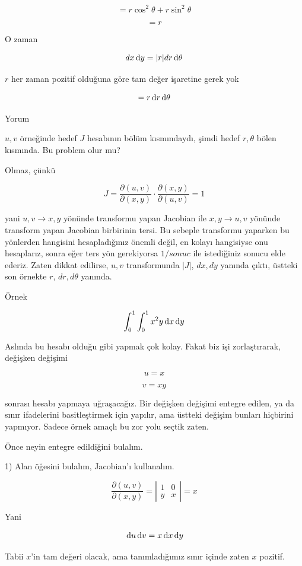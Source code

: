 \documentclass[12pt,fleqn]{article}\usepackage{../../common}
\begin{document}
$$ = r\cos^2\theta + r\sin^2\theta $$

$$ = r $$

O zaman 

$$ dx \,\mathrm{d} y = |r| dr \,\mathrm{d} \theta $$

$r$ her zaman pozitif olduğuna göre tam değer işaretine gerek yok

$$ = r \,\mathrm{d} r \,\mathrm{d} \theta$$

Yorum 

$u,v$ örneğinde hedef $J$ hesabının bölüm kısmındaydı, şimdi hedef
$r,\theta$ bölen kısmında. Bu problem olur mu? 

Olmaz, çünkü 

$$ J = \frac{\partial (u,v)}{\partial(x,y)} \cdot
\frac{\partial (x,y)}{\partial(u,v)} = 1
 $$

yani $u,v \to x,y$ yönünde transformu yapan Jacobian ile $x,y \to u,v$ yönünde
transform yapan Jacobian birbirinin tersi. Bu sebeple transformu yaparken bu
yönlerden hangisini hesapladığınız önemli değil, en kolayı hangisiyse onu
hesaplarız, sonra eğer ters yön gerekiyorsa $1 / sonuc$ ile istediğiniz sonucu
elde ederiz. Zaten dikkat edilirse, $u,v$ transformunda $|J|$, $dx,dy$ yanında
çıktı, üstteki son örnekte $r$, $dr,d\theta$ yanında.

Örnek

$$ \int_0^1 \int_0^1 x^2y \,\mathrm{d} x \,\mathrm{d} y  $$

Aslında bu hesabı olduğu gibi yapmak çok kolay. Fakat biz işi zorlaştırarak,
değişken değişimi

$$ u =x  $$

$$ v = xy $$

sonrası hesabı yapmaya uğraşacağız. Bir değişken değişimi entegre edilen, ya da
sınır ifadelerini basitleştirmek için yapılır, ama üstteki değişim bunları
hiçbirini yapmıyor. Sadece örnek amaçlı bu zor yolu seçtik zaten.

Önce neyin entegre edildiğini bulalım. 

1) Alan öğesini bulalım, Jacobian'ı kullanalım. 

$$ \frac{\partial (u,v)}{\partial(x,y)}  = 
\left|\begin{array}{rr}
1 & 0 \\
y & x
\end{array}\right| = 
x
$$

Yani

$$ \,\mathrm{d} u \,\mathrm{d} v = x \,\mathrm{d} x \,\mathrm{d} y $$

Tabii $x$'in tam değeri olacak, ama tanımladığımız sınır içinde zaten $x$
pozitif. 
\end{document}
